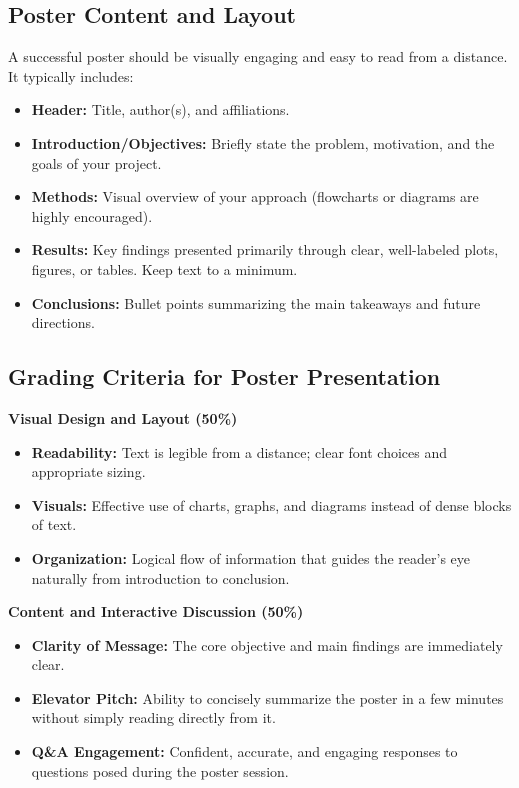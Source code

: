 \documentclass{article}
\begin{document}
\subsection{Poster Content and Layout}
A successful poster should be visually engaging and easy to read from a distance. It typically includes:
{ %
\begin{itemize}
    \item \textbf{Header:} Title, author(s), and affiliations.
    \item \textbf{Introduction/Objectives:} Briefly state the problem, motivation, and the goals of your project.
    \item \textbf{Methods:} Visual overview of your approach (flowcharts or diagrams are highly encouraged).
    \item \textbf{Results:} Key findings presented primarily through clear, well-labeled plots, figures, or tables. Keep text to a minimum.
    \item \textbf{Conclusions:} Bullet points summarizing the main takeaways and future directions.
\end{itemize}
}

\subsection{Grading Criteria for Poster Presentation}
\textbf{Visual Design and Layout (50\%)}
{ %
\begin{itemize}
    \item \textbf{Readability:} Text is legible from a distance; clear font choices and appropriate sizing.
    \item \textbf{Visuals:} Effective use of charts, graphs, and diagrams instead of dense blocks of text.
    \item \textbf{Organization:} Logical flow of information that guides the reader's eye naturally from introduction to conclusion.
\end{itemize}
}

\textbf{Content and Interactive Discussion (50\%)}
{ %
\begin{itemize}
    \item \textbf{Clarity of Message:} The core objective and main findings are immediately clear.
    \item \textbf{Elevator Pitch:} Ability to concisely summarize the poster in a few minutes without simply reading directly from it.
    \item \textbf{Q\&A Engagement:} Confident, accurate, and engaging responses to questions posed during the poster session.
\end{itemize}
}
\end{document}
